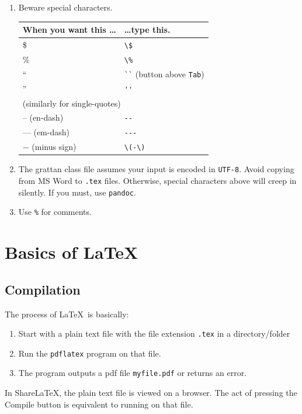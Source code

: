 \documentclass[a4paper,11pt]{scrreprt}\usepackage[]{graphicx}\usepackage[]{color}
\let\oldLaTeX\LaTeX
\renewcommand{\LaTeX}{\textrm{\oldLaTeX}}
\newcommand{\Code}[1]{\Colorbox{gray!10}{\lstinline!#1!}}
\begin{document}
\begin{enumerate}
  \item Beware special characters. 
  \begin{table}[h]
   \centering
   \begin{tabular}{ll}
   \toprule
   \textbf{When you want this \dots} & \textbf{\dots type this.} \\
   \midrule
   \$ & \verb=\$= \\
   \% & \verb=\%= \\
   `` & \verb=``= (button above \verb=Tab=) \\
   '' & \verb=''= \\
   \multicolumn{2}{l}{(similarly for single-quotes)} \\ 
   -- (en-dash) & \verb=--=  \\
   --- (em-dash) & \verb=---=  \\
   \(-\) (minus sign) & \verb=\(-\)= \\
   \bottomrule   
  \end{tabular}
  \end{table}

  


  \item The grattan class file assumes your input is encoded in \texttt{UTF-8}. Avoid copying from MS Word to \verb=.tex= files. Otherwise, special characters above will creep in silently. If you must, use \verb=pandoc=.
  \item Use \texttt{\%} for comments.
 \end{enumerate}

 \chapter{Basics of \textrm{\LaTeX}}
 \section{Compilation}
 The process of \LaTeX\ is basically:
 \begin{enumerate}
  \item Start with a plain text file with the file extension \verb=.tex= in a directory/folder
  \item Run the \verb=pdflatex= program on that file. 
  \item The program outputs a pdf file \lstinline!myfile.pdf! or returns an error.
 \end{enumerate}

 In ShareLaTeX, the plain text file is viewed on a browser. The act of pressing the Compile button is equivalent to running \Code{pdflatex} on that file.
\end{document}
